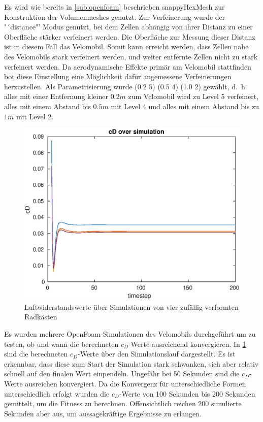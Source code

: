 Es wird wie bereits in \cref{sub:openfoam} beschrieben snappyHexMesh zur Konstruktion der Volumenmeshes genutzt.
Zur Verfeinerung wurde der "´distance"' Modus genutzt, bei dem Zellen abhängig von ihrer Distanz zu einer Oberfläche stärker verfeinert werden.
Die Oberfläche zur Messung dieser Distanz ist in diesem Fall das Velomobil.
Somit kann erreicht werden, dass Zellen nahe des Velomobils stark verfeinert werden, und weiter entfernte Zellen nicht zu stark verfeinert werden.
Da aerodynamische Effekte primär am Velomobil stattfinden bot diese Einstellung eine Möglichkeit dafür angemessene Verfeinerungen herzustellen.
Als Parametrisierung wurde (0.2 5) (0.5 4) (1.0 2) gewählt, d.~h. alles mit einer Entfernung kleiner $0.2m$ zum Velomobil wird zu Level 5 verfeinert, alles mit einem Abstand bis $0.5m$ mit Level 4 und alles mit einem Abstand bis zu $1m$ mit Level 2.

\begin{figure}[h]
	\centering
	\includegraphics[width=.8\linewidth]{bilder/wheelcaseCDConvergence}
	\caption{Luftwiderstandswerte über Simulationen von vier zufällig verformten Radkästen}
	\label{fig:wheelcase_convergence}
\end{figure}
Es wurden mehrere OpenFoam-Simulationen des Velomobils durchgeführt um zu testen, ob und wann die berechneten $c_D$-Werte ausreichend konvergieren.
In \cref{fig:wheelcase_convergence} sind die berechneten $c_D$-Werte über den Simulationslauf dargestellt. 
Es ist erkennbar, dass diese zum Start der Simulation stark schwanken, sich aber relativ schnell auf den finalen Wert einpendeln.
Ungefähr bei 50 Sekunden sind die $c_D$-Werte ausreichen konvergiert.
Da die Konvergenz für unterschiedliche Formen unterschiedlich erfolgt wurden die $c_D$-Werte von 100 Sekunden bis 200 Sekunden gemittelt, um die Fitness zu berechnen.
Offensichtlich reichen 200 simulierte Sekunden aber aus, um aussagekräftige Ergebnisse zu erlangen.



